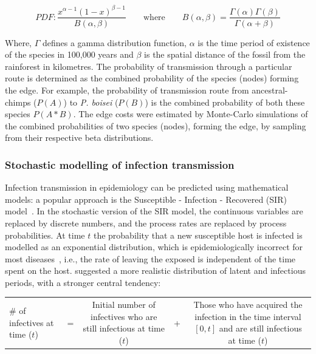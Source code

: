 \documentclass[fleqn,10pt]{wlscirep}
\begin{document}
\begin{equation}
PDF: \frac{x^{\alpha - 1}(1 - x)^{\beta - 1}}{B(\alpha, \beta)} \qquad \mathrm{where} \qquad B(\alpha, \beta) = \frac{\Gamma(\alpha)\Gamma(\beta)}{\Gamma(\alpha + \beta)}
\end{equation}

Where, $\Gamma$ defines a gamma distribution function, $\alpha$ is the time period of existence of the species in 100,000 years and $\beta$ is the spatial distance of the fossil from the rainforest in kilometres. The probability of transmission through a particular route is determined as the combined probability of the species (nodes) forming the edge. For example, the probability of transmission route from ancestral-chimps ($P(A)$) to \textit{P. boisei} ($P(B)$) is the combined probability of both these species $P(A*B)$. The edge costs were estimated by Monte-Carlo simulations of the combined probabilities of two species (nodes), forming the edge, by sampling from their respective beta distributions.
 

\subsubsection*{Stochastic modelling of infection transmission}
Infection transmission in epidemiology can be predicted using mathematical models: a popular approach is the Susceptible - Infection - Recovered (SIR) model~\citep{Chen2008}. In the stochastic version of the SIR model, the continuous variables are replaced by discrete numbers, and the process rates are replaced by process probabilities. At time $t$ the probability that a new susceptible host is infected is modelled as an exponential distribution, which is epidemiologically incorrect for most diseases~\citep{Wearing2005,Bailey1975,sartwell1950distribution}, i.e., the rate of leaving the exposed is independent of the time spent on the host. \citet{Wearing2005} suggested a more realistic distribution of latent and infectious periods, with a stronger central tendency:

\begin{table}[!h]
	\centering
	\renewcommand{\arraystretch}{1.5}
	\begin{tabulary}{\linewidth}{LCCCC}
		\# of infectives at time ($t$) & =  & 
		Initial number of infectives who are still infectious at time ($t$) & + & 
		Those who have acquired the infection in the time interval $[0, t]$ and are still infectious at time ($t$)			\\ 
	\end{tabulary}
\end{table}
\end{document}
